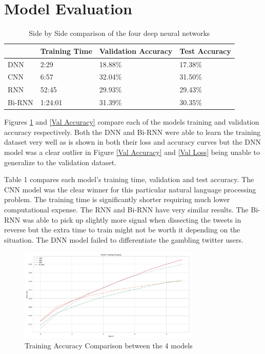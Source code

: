 \documentclass[5p,authoryear]{elsarticle}
\begin{document}
\section{Model Evaluation}


\begin{table}[!htb] 
  \centering 
  \begin{tabular}{@{\small}llll@{}} 
    \toprule %
    & {\footnotesize Training Time} &  {\footnotesize Validation Accuracy} & {\footnotesize Test Accuracy} \\ \midrule
    DNN & 2:29 & 18.88\% & 17.38\% \\
    CNN & 6:57 & 32.04\% & 31.50\% \\
    RNN & 52:45 & 29.93\% & 29.43\% \\
    Bi-RNN & 1:24:01 & 31.39\% & 30.35\% \\ 
    \bottomrule
\end{tabular} \caption{Side by Side comparison of the four deep neural networks} \label{table_eval}
\end{table}


Figures \ref{Train Accuracy} and \ref{Val Accuracy} compare each of the models training and validation accuracy respectively. Both the DNN and Bi-RNN were able to learn the training dataset very well as is shown in both their loss and accuracy curves but the DNN model was a clear outlier in Figure \ref{Val Accuracy} and \ref{Val Loss} being unable to generalize to the validation dataset. 

Table 1 compares each model’s training time, validation and test accuracy. The CNN model was the clear winner for this particular natural language processing problem. The training time is significantly shorter requiring much lower computational expense. The RNN and Bi-RNN have very similar results. The Bi-RNN was able to pick up slightly more signal when dissecting the tweets in reverse but the extra time to train might not be worth it depending on the situation. The DNN model failed to differentiate the gambling twitter users.


\begin{figure}[!htb] \centering
	\includegraphics[width=3.4in]{figures/All_Train_Acc.png}
	\caption[]{Training Accuracy Comparison between the 4 models} 
	\label{Train Accuracy} 
\end{figure}
\end{document}
